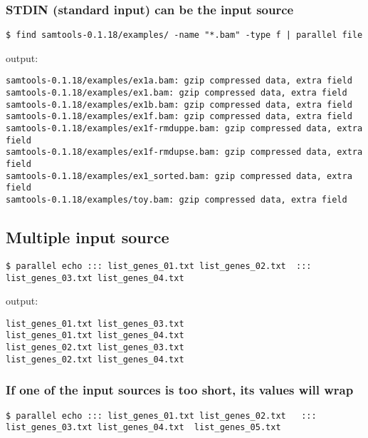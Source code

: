 \documentclass{article}
\begin{document}
\subsubsection{STDIN (standard input) can be the input source}
\begin{lstlisting}
$ find samtools-0.1.18/examples/ -name "*.bam" -type f | parallel file
\end{lstlisting}
output:
\begin{lstlisting}
samtools-0.1.18/examples/ex1a.bam: gzip compressed data, extra field
samtools-0.1.18/examples/ex1.bam: gzip compressed data, extra field
samtools-0.1.18/examples/ex1b.bam: gzip compressed data, extra field
samtools-0.1.18/examples/ex1f.bam: gzip compressed data, extra field
samtools-0.1.18/examples/ex1f-rmduppe.bam: gzip compressed data, extra field
samtools-0.1.18/examples/ex1f-rmdupse.bam: gzip compressed data, extra field
samtools-0.1.18/examples/ex1_sorted.bam: gzip compressed data, extra field
samtools-0.1.18/examples/toy.bam: gzip compressed data, extra field
\end{lstlisting}


\subsection{Multiple input source}


\begin{lstlisting}
$ parallel echo ::: list_genes_01.txt list_genes_02.txt  ::: list_genes_03.txt list_genes_04.txt  
\end{lstlisting}
output:
\begin{lstlisting}
list_genes_01.txt list_genes_03.txt
list_genes_01.txt list_genes_04.txt
list_genes_02.txt list_genes_03.txt
list_genes_02.txt list_genes_04.txt
\end{lstlisting}

\subsubsection{If one of the input sources is too short, its values will wrap}
\begin{lstlisting}
$ parallel echo ::: list_genes_01.txt list_genes_02.txt   ::: list_genes_03.txt list_genes_04.txt  list_genes_05.txt
\end{lstlisting}
\end{document}
